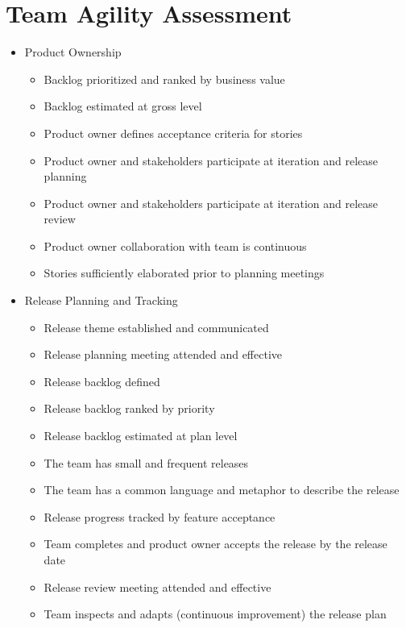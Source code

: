 \begin{appendices}
\begin{itemize}
\end{itemize}




\chapter{Team Agility Assessment}
\label{sec:team_agility_assessment} %

\begin{itemize}
	\item Product Ownership
		\begin{itemize}
			\item Backlog prioritized and ranked by business value 
			\item Backlog estimated at gross level 
			\item Product owner defines acceptance criteria for stories 
			\item Product owner and stakeholders participate at iteration and release planning 
			\item Product owner and stakeholders participate at iteration and release review 
			\item Product owner collaboration with team is continuous 
			\item Stories sufficiently elaborated prior to planning meetings
		\end{itemize}
	\item Release Planning and Tracking
		\begin{itemize}
			\item Release theme established and communicated 
			\item Release planning meeting attended and effective 
			\item Release backlog defined 
			\item Release backlog ranked by priority 
			\item Release backlog estimated at plan level 
			\item The team has small and frequent releases
			\item The team has a common language and metaphor to describe the release
			\item Release progress tracked by feature acceptance
			\item Team completes and product owner accepts the release by the release date
			\item Release review meeting attended and effective
			\item Team inspects and adapts (continuous improvement) the release plan

\end{itemize}
\end{itemize}
\end{appendices}
